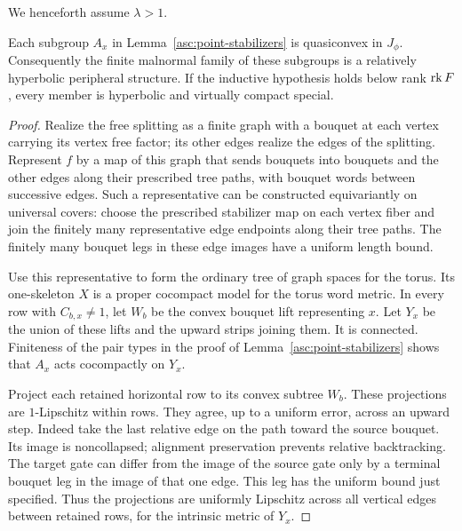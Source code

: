 We henceforth assume $\lambda>1$.

\begin{lemma}\label{asc:quasiconvex-peripherals}
Each subgroup $A_x$ in Lemma~\ref{asc:point-stabilizers} is quasiconvex in
$J_\phi$. Consequently the finite malnormal family of these subgroups
is a relatively hyperbolic peripheral structure. If the inductive
hypothesis holds below rank $\operatorname{rk} F$, every member is hyperbolic and
virtually compact special.
\end{lemma}

\begin{proof}
Realize the free splitting as a finite graph with a bouquet at each
vertex carrying its vertex free factor; its other edges realize the
edges of the splitting. Represent $f$ by a map of this graph that sends
bouquets into bouquets and the other edges along their prescribed tree
paths, with bouquet words between successive edges. Such a representative
can be constructed equivariantly on universal covers: choose the
prescribed stabilizer map on each vertex fiber and join the finitely
many representative edge endpoints along their tree paths. The finitely
many bouquet legs in these edge images have a uniform length bound.

Use this representative to form the ordinary tree of graph spaces for
the torus. Its one-skeleton $X$ is a proper cocompact model for the torus
word metric. In every row with $C_{b,x}\ne1$, let $W_b$ be the convex
bouquet lift representing $x$. Let $Y_x$ be the union of these lifts and
the upward strips joining them. It is connected. Finiteness of the pair
types in the proof of Lemma~\ref{asc:point-stabilizers} shows that $A_x$
acts cocompactly on $Y_x$.

Project each retained horizontal row to its convex subtree $W_b$.
These projections are $1$-Lipschitz within rows. They agree, up to a
uniform error, across an upward step. Indeed take the last relative
edge on the path toward the source bouquet. Its image is noncollapsed;
alignment preservation prevents relative backtracking. The target gate
can differ from the image of the source gate only by a terminal bouquet
leg in the image of that one edge. This leg has the uniform bound just
specified. Thus the projections are uniformly Lipschitz across all
vertical edges between retained rows, for the intrinsic metric of $Y_x$.


\end{proof}
